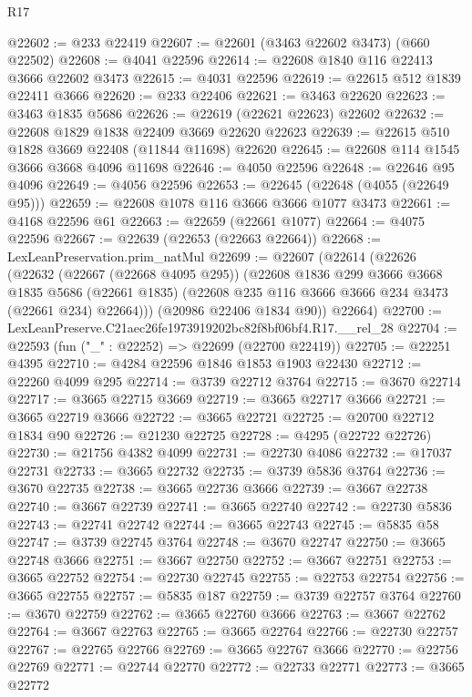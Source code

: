 \begin{lexlean}{R17}
\begin{coremodule}
@22602 := @233 @22419
@22607 := @22601 (@3463 @22602 @3473) (@660 @22502)
@22608 := @4041 @22596
@22614 := @22608 @1840 @116 @22413 @3666 @22602 @3473
@22615 := @4031 @22596
@22619 := @22615 @512 @1839 @22411 @3666
@22620 := @233 @22406
@22621 := @3463 @22620
@22623 := @3463 @1835 @5686
@22626 := @22619 (@22621 @22623) @22602
@22632 := @22608 @1829 @1838 @22409 @3669 @22620 @22623
@22639 := @22615 @510 @1828 @3669 @22408 (@11844 @11698) @22620
@22645 := @22608 @114 @1545 @3666 @3668 @4096 @11698
@22646 := @4050 @22596
@22648 := @22646 @95 @4096
@22649 := @4056 @22596
@22653 := @22645 (@22648 (@4055 (@22649 @95)))
@22659 := @22608 @1078 @116 @3666 @3666 @1077 @3473
@22661 := @4168 @22596 @61
@22663 := @22659 (@22661 @1077)
@22664 := @4075 @22596
@22667 := @22639 (@22653 (@22663 @22664))
@22668 := LexLeanPreservation.prim_natMul
@22699 := @22607
    (@22614
      (@22626
        (@22632
          (@22667 (@22668 @4095 @295))
          (@22608
            @1836
            @299
            @3666
            @3668
            @1835
            @5686
            (@22661 @1835)
            (@22608 @235 @116 @3666 @3666 @234 @3473 (@22661 @234) @22664)))
        (@20986 @22406 @1834 @90))
      @22664)
@22700 := LexLeanPreserve.C21aec26fe1973919202bc82f8bf06bf4.R17.__rel_28
@22704 := @22593 (fun ("_" : @22252) => @22699 (@22700 @22419))
@22705 := @22251 @4395
@22710 := @4284 @22596 @1846 @1853 @1903 @22430
@22712 := @22260 @4099 @295
@22714 := @3739 @22712 @3764
@22715 := @3670 @22714
@22717 := @3665 @22715 @3669
@22719 := @3665 @22717 @3666
@22721 := @3665 @22719 @3666
@22722 := @3665 @22721
@22725 := @20700 @22712 @1834 @90
@22726 := @21230 @22725
@22728 := @4295 (@22722 @22726)
@22730 := @21756 @4382 @4099
@22731 := @22730 @4086
@22732 := @17037 @22731
@22733 := @3665 @22732
@22735 := @3739 @5836 @3764
@22736 := @3670 @22735
@22738 := @3665 @22736 @3666
@22739 := @3667 @22738
@22740 := @3667 @22739
@22741 := @3665 @22740
@22742 := @22730 @5836
@22743 := @22741 @22742
@22744 := @3665 @22743
@22745 := @5835 @58
@22747 := @3739 @22745 @3764
@22748 := @3670 @22747
@22750 := @3665 @22748 @3666
@22751 := @3667 @22750
@22752 := @3667 @22751
@22753 := @3665 @22752
@22754 := @22730 @22745
@22755 := @22753 @22754
@22756 := @3665 @22755
@22757 := @5835 @187
@22759 := @3739 @22757 @3764
@22760 := @3670 @22759
@22762 := @3665 @22760 @3666
@22763 := @3667 @22762
@22764 := @3667 @22763
@22765 := @3665 @22764
@22766 := @22730 @22757
@22767 := @22765 @22766
@22769 := @3665 @22767 @3666
@22770 := @22756 @22769
@22771 := @22744 @22770
@22772 := @22733 @22771
@22773 := @3665 @22772

\end{coremodule}
\end{lexlean}
